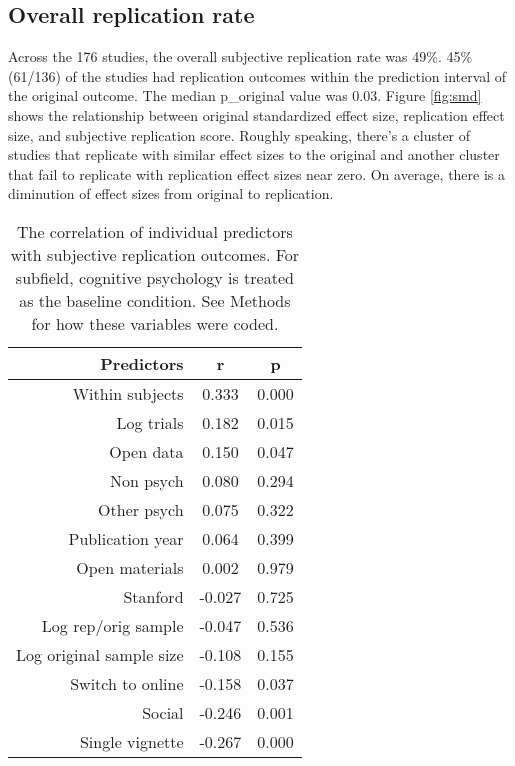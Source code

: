 \documentclass[
  english,
  a4paper,
]{article}
\begin{document}
\hypertarget{overall-replication-rate}{%
\subsection{Overall replication rate}\label{overall-replication-rate}}

Across the 176 studies, the overall subjective replication rate was 49\%. 45\% (61/136) of the studies had replication outcomes within the prediction interval of the original outcome. The median p\_original value was 0.03. Figure \ref{fig:smd} shows the relationship between original standardized effect size, replication effect size, and subjective replication score. Roughly speaking, there's a cluster of studies that replicate with similar effect sizes to the original and another cluster that fail to replicate with replication effect sizes near zero. On average, there is a diminution of effect sizes from original to replication.

\begin{table}[!h]

\caption{\label{tab:cor}The correlation of individual predictors with subjective replication outcomes. For subfield, cognitive psychology is treated as the baseline condition. See Methods for how these variables were coded.}
\centering
\fontsize{10}{12}\selectfont
\begin{tabular}[t]{r|c|c}
\hline
Predictors & r & p\\
\hline
Within subjects & 0.333 & 0.000\\
\hline
Log trials & 0.182 & 0.015\\
\hline
Open data & 0.150 & 0.047\\
\hline
Non psych & 0.080 & 0.294\\
\hline
Other psych & 0.075 & 0.322\\
\hline
Publication year & 0.064 & 0.399\\
\hline
Open materials & 0.002 & 0.979\\
\hline
Stanford & -0.027 & 0.725\\
\hline
Log rep/orig sample & -0.047 & 0.536\\
\hline
Log original sample size & -0.108 & 0.155\\
\hline
Switch to online & -0.158 & 0.037\\
\hline
Social & -0.246 & 0.001\\
\hline
Single vignette & -0.267 & 0.000\\
\hline
\end{tabular}
\end{table}
\end{document}
